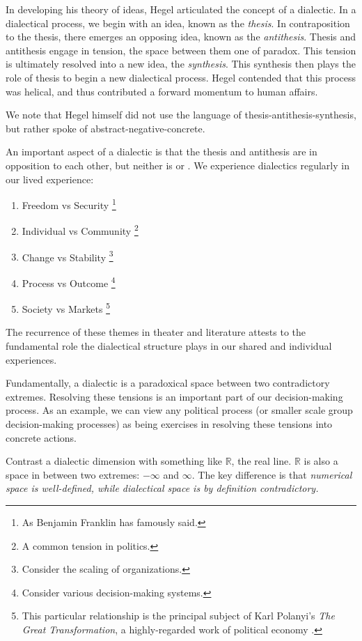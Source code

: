 In developing his theory of ideas, Hegel articulated the concept of a dialectic.
In a dialectical process, we begin with an idea, known as the \textit{thesis}.
In contraposition to the thesis, there emerges an opposing idea, known as the \textit{antithesis}.
Thesis and antithesis engage in tension, the space between them one of paradox.
This tension is ultimately resolved into a new idea, the \textit{synthesis}.
This synthesis then plays the role of thesis to begin a new dialectical process.
Hegel contended that this process was helical, and thus contributed a forward momentum to human affairs.

We note that Hegel himself did not use the language of thesis-antithesis-synthesis, but rather spoke of abstract-negative-concrete.

An important aspect of a dialectic is that the thesis and antithesis are in opposition to each other, but neither is  or .
We experience dialectics regularly in our lived experience:

\begin{enumerate}
  \item Freedom vs Security \footnote{As Benjamin Franklin has famously said.}
  \item Individual vs Community \footnote{A common tension in politics.}
  \item Change vs Stability \footnote{Consider the scaling of organizations.}
  \item Process vs Outcome \footnote{Consider various decision-making systems.}
  \item Society vs Markets \footnote{This particular relationship is the principal subject of Karl Polanyi's \textit{The Great Transformation}, a highly-regarded work of political economy \citep{polanyi:1944}.}
\end{enumerate}

The recurrence of these themes in theater and literature attests to the fundamental role the dialectical structure plays in our shared and individual experiences.

Fundamentally, a dialectic is a paradoxical space between two contradictory extremes.
Resolving these tensions is an important part of our decision-making process.
As an example, we can view any political process (or smaller scale group decision-making processes) as being exercises in resolving these tensions into concrete actions.

Contrast a dialectic dimension with something like $\mathbb{R}$, the real line.
$\mathbb{R}$ is also a space in between two extremes: $-\infty$ and $\infty$.
The key difference is that \textit{numerical space is well-defined, while dialectical space is by definition contradictory.}

